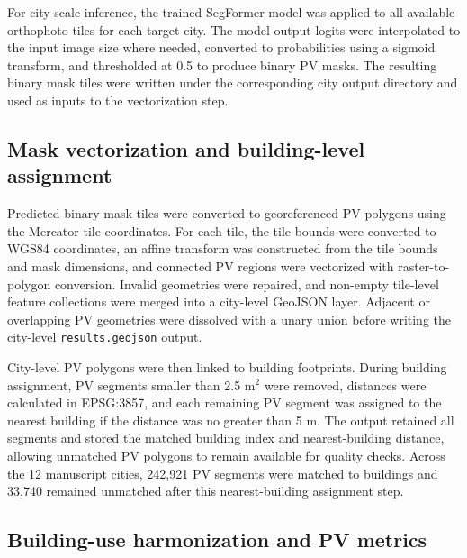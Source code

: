 \documentclass[pdflatex,sn-nature]{sn-jnl}
\begin{document}
\begin{table}[h!]
\centering
\caption{\textbf{Rooftop PV segmentation and building-assignment parameters.} Settings are taken from \texttt{train\_border\_supervised.py}, \texttt{inference.py}, \texttt{convert\_mask\_json.py} and \texttt{postprocess\_results\_on\_buildings.py}.}

\label{tab:s5_segmentation_model_parameters}
\end{table}

For city-scale inference, the trained SegFormer model was applied to all available orthophoto tiles for each target city. The model output logits were interpolated to the input image size where needed, converted to probabilities using a sigmoid transform, and thresholded at 0.5 to produce binary PV masks. The resulting binary mask tiles were written under the corresponding city output directory and used as inputs to the vectorization step.

\subsection{Mask vectorization and building-level assignment}

Predicted binary mask tiles were converted to georeferenced PV polygons using the Mercator tile coordinates. For each tile, the tile bounds were converted to WGS84 coordinates, an affine transform was constructed from the tile bounds and mask dimensions, and connected PV regions were vectorized with raster-to-polygon conversion. Invalid geometries were repaired, and non-empty tile-level feature collections were merged into a city-level GeoJSON layer. Adjacent or overlapping PV geometries were dissolved with a unary union before writing the city-level \texttt{results.geojson} output.

City-level PV polygons were then linked to building footprints. During building assignment, PV segments smaller than 2.5 m$^2$ were removed, distances were calculated in EPSG:3857, and each remaining PV segment was assigned to the nearest building if the distance was no greater than 5 m. The output retained all segments and stored the matched building index and nearest-building distance, allowing unmatched PV polygons to remain available for quality checks. Across the 12 manuscript cities, 242,921 PV segments were matched to buildings and 33,740 remained unmatched after this nearest-building assignment step.

\subsection{Building-use harmonization and PV metrics}
\end{document}
